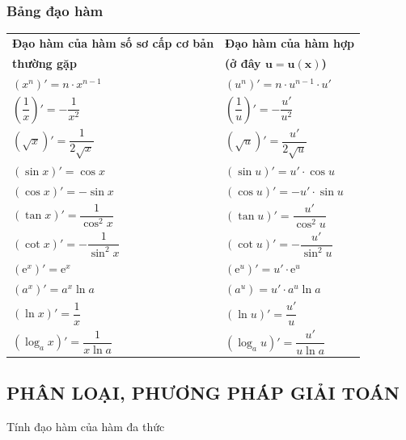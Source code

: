 \subsubsection*{Bảng đạo hàm}
\begin{center}
	\renewcommand{\arraystretch}{2}
	\begin{longtable}{|C{0.45\textwidth}|C{0.45\textwidth}|}
	\hline
	\centerline{\bf Đạo hàm của hàm số sơ cấp cơ bản}& \centerline{\bf Đạo hàm của hàm hợp}\\
	\centerline{\bf thường gặp} & \centerline{\bf(ở đây $\mathbf{u=u(x)}$)}\\
	\hline
	$\left(x^n\right)'=n\cdot x^{n -1}$ & $\left(u^n\right)'=n\cdot u^{n-1}\cdot u'$\\
	\hline
	$\left(\dfrac{1}{x}\right)'=-\dfrac{1}{x^2}$& $\left(\dfrac{1}{u}\right)'=-\dfrac{u'}{u^2}$\\
	\hline
	$\left(\sqrt{x}\right)'=\dfrac{1}{2\sqrt{x}}$&
	$\left(\sqrt{u}\right)'=\dfrac{u'}{2\sqrt{u}}$\\
	\hline
	$\left(\sin x\right)'=\cos x$& $\left(\sin u\right)'=u'\cdot \cos u$\\
	\hline
	$\left(\cos x\right)'=-\sin x$& $\left(\cos u\right)'=-u'\cdot\sin u $ \\
	\hline
	$\left(\tan x\right)'=\dfrac{1}{\cos^2 x}$&$\left(\tan u\right)'=\dfrac{u'}{\cos^2 u}$ \\
	\hline
	$\left(\cot x\right)'=-\dfrac{1}{\sin^2 x}$&$\left(\cot u\right)'=-\dfrac{u'}{\sin^2 u}$ \\
	\hline
	$\left(\mathrm{e}^x\right)'=\mathrm{e}^{x}$& $\left(\mathrm{e}^{u}\right)'=u'\cdot \mathrm{e}^{u}$ \\
	\hline
	$\left(a^{x}\right)'=a^{x}\ln a$&$\left(a^{u}\right)=u'\cdot a^{u}\ln a$ \\
	\hline
	$\left(\ln x\right)'=\dfrac{1}{x}$& $\left(\ln u\right)'=\dfrac{u'}{u}$ \\
	\hline
	$\left(\log_{a}x\right)' =\dfrac{1}{x\ln a}$& $\left(\log_{a} u\right)'=\dfrac{u'}{u\ln a}$\\
	\hline
	\end{longtable}
\end{center}
\subsection{PHÂN LOẠI, PHƯƠNG PHÁP GIẢI TOÁN}
\begin{dang}{Tính đạo hàm của hàm đa thức}
\end{dang}

